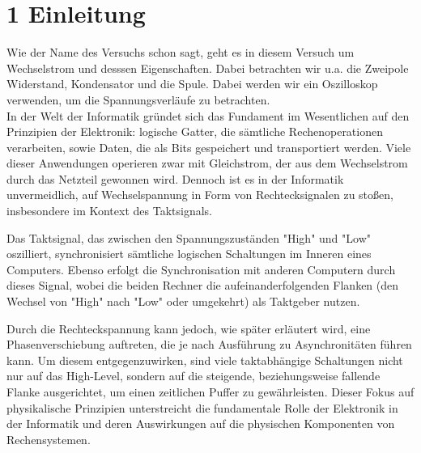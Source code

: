 \chapter*{1 Einleitung}
\setcounter{chapter}{1}
\setcounter{section}{0}
\setcounter{subsection}{0}

Wie der Name des Versuchs schon sagt, geht es in diesem Versuch um Wechselstrom und desssen Eigenschaften. Dabei betrachten wir u.a. die Zweipole Widerstand, Kondensator und die Spule. Dabei werden wir ein Oszilloskop verwenden, um die Spannungsverläufe zu betrachten.\\

In der Welt der Informatik gründet sich das Fundament im Wesentlichen auf den Prinzipien der Elektronik: logische Gatter, die sämtliche Rechenoperationen verarbeiten, sowie Daten, die als Bits gespeichert und transportiert werden. Viele dieser Anwendungen operieren zwar mit Gleichstrom, der aus dem Wechselstrom durch das Netzteil gewonnen wird. Dennoch ist es in der Informatik unvermeidlich, auf Wechselspannung in Form von Rechtecksignalen zu stoßen, insbesondere im Kontext des Taktsignals.

Das Taktsignal, das zwischen den Spannungszuständen "High" und "Low" oszilliert, synchronisiert sämtliche logischen Schaltungen im Inneren eines Computers. Ebenso erfolgt die Synchronisation mit anderen Computern durch dieses Signal, wobei die beiden Rechner die aufeinanderfolgenden Flanken (den Wechsel von "High" nach "Low" oder umgekehrt) als Taktgeber nutzen.

Durch die Rechteckspannung kann jedoch, wie später erläutert wird, eine Phasenverschiebung auftreten, die je nach Ausführung zu Asynchronitäten führen kann. Um diesem entgegenzuwirken, sind viele taktabhängige Schaltungen nicht nur auf das High-Level, sondern auf die steigende, beziehungsweise fallende Flanke ausgerichtet, um einen zeitlichen Puffer zu gewährleisten. Dieser Fokus auf physikalische Prinzipien unterstreicht die fundamentale Rolle der Elektronik in der Informatik und deren Auswirkungen auf die physischen Komponenten von Rechensystemen.